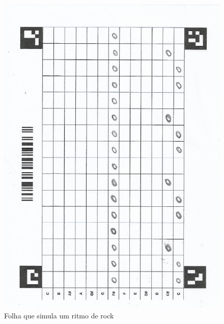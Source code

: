 \documentclass[12pt]{report}
\begin{document}
\begin{figure}[H]
  \centering
  \includegraphics[angle=270,origin=c,width=1\textwidth]{imagens/bateria_rock.jpeg}
  \caption{Folha que simula um ritmo de rock}
  \label{fig:bateria_rock}
\end{figure}


\end{document}
